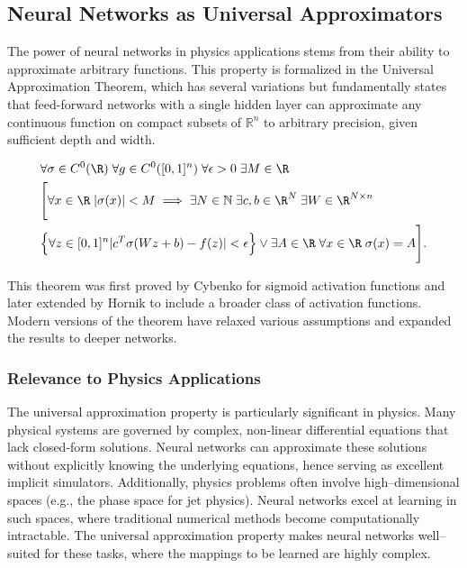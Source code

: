     \subsection{Neural Networks as Universal Approximators}
        The power of neural networks in physics applications stems from their ability to approximate arbitrary functions.
        This property is formalized in the Universal Approximation Theorem, which has several variations but fundamentally states that feed-forward networks with a single hidden layer can approximate any continuous function on compact subsets of \(\mathbb{R}^n\) to arbitrary precision, given sufficient depth and width.
        \begin{theorem}
        \begin{align}
            &\forall \sigma\in C^0(\R)\; \forall g\in C^0([0, 1]^n)\;\forall\epsilon > 0\;\exists M\in \R\\
            &\Bigg[\forall x\in\R\;|\sigma(x)| < M\implies \exists N\in\mathbb{N}\;\exists c, b\in \R^N\;\exists W\in \R^{N\times n}\\
            &\Big\{\forall z\in[0, 1]^n |c^T\sigma(Wz + b) - f(z)|<\epsilon\Big\} \lor \exists A\in\R\;\forall x\in\R\;\sigma(x) = A\Bigg].
            \end{align}
        \end{theorem}
        This theorem was first proved by Cybenko for sigmoid activation functions\kd{} and later extended by Hornik to include a broader class of activation functions.\kd{} Modern versions of the theorem have relaxed various assumptions and expanded the results to deeper networks.
        \subsubsection{Relevance to Physics Applications}
            The universal approximation property is particularly significant in physics.
            Many physical systems are governed by complex, non-linear differential equations that lack closed-form solutions.
            Neural networks can approximate these solutions without explicitly knowing the underlying equations, hence serving as excellent implicit simulators.
            Additionally, physics problems often involve high--dimensional spaces (e.g., the phase space for jet physics).
            Neural networks excel at learning in such spaces, where traditional numerical methods become computationally intractable.
            The universal approximation property makes neural networks well--suited for these tasks, where the mappings to be learned are highly complex.

